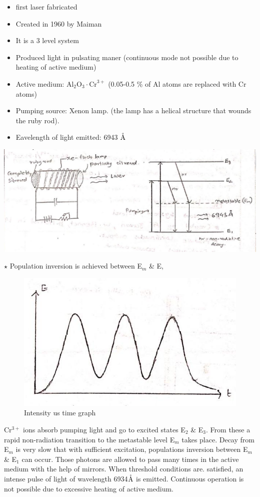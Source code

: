\documentclass[12pt, a4paper]{article}
\begin{document}

\begin{itemize}
	\item first laser fabricated
	\item Created in 1960 by Maiman
	\item It is a 3 level system
	\item Produced light in pulsating maner (continuous mode not possible due to heating of active medium)
	\item Active medium: $\mathrm{Al}_{2} \mathrm{O}_{3} \cdot \mathrm{Cr}^{3+}$ (0.05-0.5 \% of Al atoms are replaced with Cr atoms)
	\item Pumping source: Xenon lamp. (the lamp has a helical structure that wounds the ruby rod).
	\item Eavelength of light emitted: 6943 $\mathring{\textrm{A}}$
\end{itemize}

\begin{center}
	\includegraphics[max width=\textwidth]{2024_06_16_30d750483617f1939202g-03(1)}
\end{center}

$\star$ Population inversion is achieved between E$_m$ \& E,
\begin{figure}
	\includegraphics[max width=.5\linewidth]{2024_06_16_30d750483617f1939202g-03}
	\caption*{Intensity us time graph}
\end{figure}

Cr$^{3+}$ ions absorb pumping light and go to excited states E$_2$ \& E$_3$. From these a rapid non-radiation transition to the metastable level E$_m$ takes place. Decay from E$_m$ is very slow that with sufficient excitation, populations inversion between E$_m$ \& E$_1$ can occur. Those photons are allowed to pass many times in the active medium with the help of mirrors. When threshold conditions are. satisfied, an intense pulse of light of wavelength 6934$\mathring{\textrm{A}}$ is emitted. Continuous operation is not possible due to excessive heating of active medium.
\end{document}
